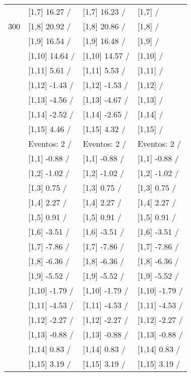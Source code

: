 \begin{table}
\begin{tabular}[t]{llll}
 & {}[1,7] 16.27  / & {}[1,7] 16.23  / & {}[1,7]  /\\
300 & {}[1,8] 20.92  / & {}[1,8] 20.86  / & {}[1,8]  /\\
\addlinespace
 & {}[1,9] 16.54  / & {}[1,9] 16.48  / & {}[1,9]  /\\
 & {}[1,10] 14.64  / & {}[1,10] 14.57  / & {}[1,10]  /\\
 & {}[1,11] 5.61  / & {}[1,11] 5.53  / & {}[1,11]  /\\
 & {}[1,12] -1.43  / & {}[1,12] -1.53  / & {}[1,12]  /\\
 & {}[1,13] -4.56  / & {}[1,13] -4.67  / & {}[1,13]  /\\
\addlinespace
 & {}[1,14] -2.52  / & {}[1,14] -2.65  / & {}[1,14]  /\\
 & {}[1,15] 4.46  / & {}[1,15] 4.32  / & {}[1,15]  /\\
 & Eventos:  2 / & Eventos:  2 / & Eventos:  2 /\\
 & {}[1,1] -0.88  / & {}[1,1] -0.88  / & {}[1,1] -0.88  /\\
 & {}[1,2] -1.02  / & {}[1,2] -1.02  / & {}[1,2] -1.02  /\\
\addlinespace
 & {}[1,3] 0.75  / & {}[1,3] 0.75  / & {}[1,3] 0.75  /\\
 & {}[1,4] 2.27  / & {}[1,4] 2.27  / & {}[1,4] 2.27  /\\
 & {}[1,5] 0.91  / & {}[1,5] 0.91  / & {}[1,5] 0.91  /\\
 & {}[1,6] -3.51  / & {}[1,6] -3.51  / & {}[1,6] -3.51  /\\
 & {}[1,7] -7.86  / & {}[1,7] -7.86  / & {}[1,7] -7.86  /\\
\addlinespace
500 & {}[1,8] -6.36  / & {}[1,8] -6.36  / & {}[1,8] -6.36  /\\
 & {}[1,9] -5.52  / & {}[1,9] -5.52  / & {}[1,9] -5.52  /\\
 & {}[1,10] -1.79  / & {}[1,10] -1.79  / & {}[1,10] -1.79  /\\
 & {}[1,11] -4.53  / & {}[1,11] -4.53  / & {}[1,11] -4.53  /\\
 & {}[1,12] -2.27  / & {}[1,12] -2.27  / & {}[1,12] -2.27  /\\
\addlinespace
 & {}[1,13] -0.88  / & {}[1,13] -0.88  / & {}[1,13] -0.88  /\\
 & {}[1,14] 0.83  / & {}[1,14] 0.83  / & {}[1,14] 0.83  /\\
 & {}[1,15] 3.19  / & {}[1,15] 3.19  / & {}[1,15] 3.19  /\\
\bottomrule
\end{tabular}
\end{table}
